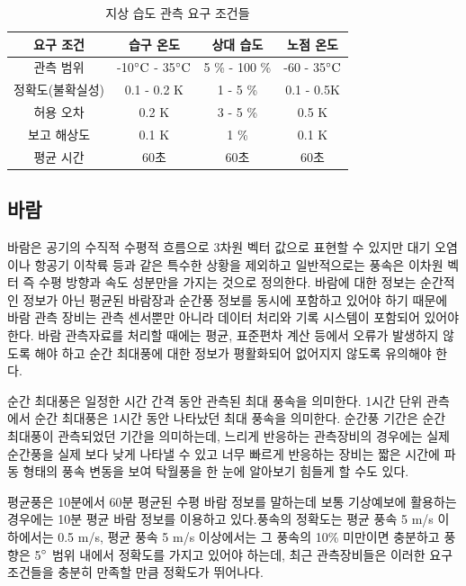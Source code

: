 \begin{itemize}
{\begin{table}[h]
	\centering
	\caption{지상 습도 관측 요구 조건들}
\begin{tabular}{c|c|c|c}
	\hline 
	요구 조건 & 습구 온도 & 상대 습도 & 노점 온도 \\ 
	\hline 
	관측 범위 & -10$\rm ^{\circ}C$ - 35$\rm ^{\circ}C$ & 5 \% - 100 \% & -60 - 35$\rm ^{\circ}C$   \\ 
	\hline 
	정확도(불확실성) & 0.1 - 0.2 K & 1 - 5 \% & 0.1 - 0.5K \\ 
	\hline 
	허용 오차 & 0.2 K & 3 - 5 \% & 0.5 K \\ 
	\hline 
	보고 해상도 & 0.1 K & 1 \% & 0.1 K \\ 
	\hline 
	평균 시간 & 60초 & 60초 & 60초 \\ 
	\hline 
\end{tabular} 
	\label{table:33}
\end{table}


\subsection{바람}

바람은 공기의 수직적 수평적 흐름으로 3차원 벡터 값으로 표현할 수 있지만 대기 오염이나 항공기 이착륙 등과 같은 특수한 상황을 제외하고 일반적으로는 풍속은 이차원 벡터 즉 수평 방향과 속도 성분만을 가지는 것으로 정의한다.
바람에 대한 정보는 순간적인 정보가 아닌 평균된 바람장과 순간풍 정보를 동시에 포함하고 있어야 하기 때문에 바람 관측 장비는 관측 센서뿐만 아니라 데이터 처리와 기록 시스템이 포함되어 있어야 한다. 바람 관측자료를 처리할 때에는 평균, 표준편차 계산 등에서 오류가 발생하지 않도록 해야 하고 순간 최대풍에 대한 정보가 평활화되어 없어지지 않도록 유의해야 한다. 

순간 최대풍은 일정한 시간 간격 동안 관측된 최대 풍속을 의미한다. 1시간 단위 관측에서 순간 최대풍은 1시간 동안 나타났던 최대 풍속을 의미한다. 순간풍 기간은 순간 최대풍이 관측되었던 기간을 의미하는데, 느리게 반응하는 관측장비의 경우에는 실제 순간풍을 실제 보다 낮게 나타낼 수 있고 너무 빠르게 반응하는 장비는 짧은 시간에 파동 형태의 풍속 변동을 보여 탁월풍을 한 눈에 알아보기 힘들게 할 수도 있다.

평균풍은 10분에서 60분 평균된 수평 바람 정보를 말하는데 보통 기상예보에 활용하는 경우에는 10분 평균 바람 정보를 이용하고 있다.풍속의 정확도는 평균 풍속 5 m/s 이하에서는 0.5 m/s, 평균 풍속 5 m/s 이상에서는 그 풍속의 10\% 미만이면 충분하고 풍향은 5$\rm ^{\circ}$ 범위 내에서 정확도를 가지고 있어야 하는데, 최근 관측장비들은 이러한 요구 조건들을 충분히 만족할 만큼 정확도가 뛰어나다.

}
\end{itemize}
